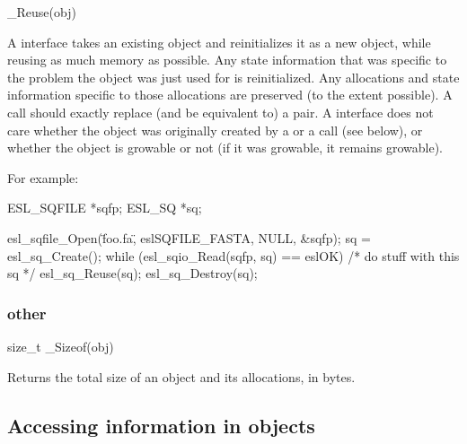 \begin{sreapi}
\hypertarget{ifc:Reuse}
{\item[\_Reuse(obj)]}

A  interface takes an existing object and
reinitializes it as a new object, while reusing as much memory as
possible. Any state information that was specific to the problem the
object was just used for is reinitialized. Any allocations and state
information specific to those allocations are preserved (to the extent
possible).  A  call should exactly replace (and be
equivalent to) a  pair. A
 interface does not care whether the object was
originally created by a  or a 
call (see below), or whether the object is growable or not (if it was
growable, it remains growable).
\end{sreapi}

For example:

\begin{cchunk}
   ESL_SQFILE *sqfp;
   ESL_SQ     *sq;

   esl_sqfile_Open(\"foo.fa\", eslSQFILE_FASTA, NULL, &sqfp);
   sq = esl_sq_Create();
   while (esl_sqio_Read(sqfp, sq) == eslOK)
    {
       /* do stuff with this sq */
       esl_sq_Reuse(sq);
    }
   esl_sq_Destroy(sq);
\end{cchunk}

  \subsubsection{other}
\begin{sreapi}
\hypertarget{ifc:Sizeof}
{\item[size\_t \_Sizeof(obj)]}

Returns the total size of an object and its allocations, in bytes.
\end{sreapi}


 \subsection{Accessing information in objects}

